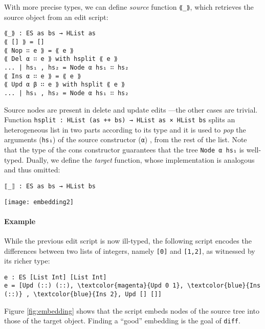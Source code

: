 \documentclass{sigplanconf}
\theoremstyle{plain}
\begin{document}
With more precise types, we can define \emph{source} function
\texttt{⟪\_⟫}, which retrieves the source object from an edit script:
\begin{verbatim}
⟪_⟫ : ES as bs → HList as
⟪ [] ⟫ = []
⟪ Nop ∷ e ⟫ = ⟪ e ⟫
⟪ Del α ∷ e ⟫ with hsplit ⟪ e ⟫
... | hs₁ , hs₂ = Node α hs₁ ∷ hs₂
⟪ Ins α ∷ e ⟫ = ⟪ e ⟫
⟪ Upd α β ∷ e ⟫ with hsplit ⟪ e ⟫
... | hs₁ , hs₂ = Node α hs₁ ∷ hs₂
\end{verbatim}
%
Source nodes are present in delete and update edits ---the other cases
are trivial.
% 
Function \texttt{hsplit : HList (as ++ bs) → HList as × HList bs}
splits an heterogeneous list in two parts according to its type and it
is used to \emph{pop} the arguments (\texttt{hs₁}) of the source
constructor (\texttt{α}) , from the rest of the list.
%
Note that the type of the cons constructor guarantees that the tree
\texttt{Node α hs₁} is well-typed.
%
Dually, we define the \emph{target} function, whose implementation is
analogous and thus omitted:
\begin{verbatim}
⟦_⟧ : ES as bs → HList bs
\end{verbatim}

\begin{figure*}[!t]
\centering
\texttt{[image: embedding2]}
\caption{The embedding induced by \texttt{[Upd (::) (::), \textcolor{magenta}{Upd 0 1}, \textcolor{blue}{Ins (::)} , \textcolor{blue}{Ins 2}, Upd [] []]}}
\label{fig:embedding}
\end{figure*}

\paragraph{Example}
While the previous edit script is now ill-typed, the following script
encodes the differences between two lists of integers, namely \texttt{[0]} and \texttt{[1,2]}, as witnessed by its richer type:
\begin{Verbatim}[commandchars=\\\{\}]
e : ES [List Int] [List Int]
e = [Upd (::) (::), \textcolor{magenta}{Upd 0 1}, \textcolor{blue}{Ins (::)} , \textcolor{blue}{Ins 2}, Upd [] []]
\end{Verbatim}

Figure \ref{fig:embedding} shows that the script embeds nodes of the
source tree into those of the target object.
%
Finding a ``good'' embedding is the goal of \texttt{diff}.
\end{document}
